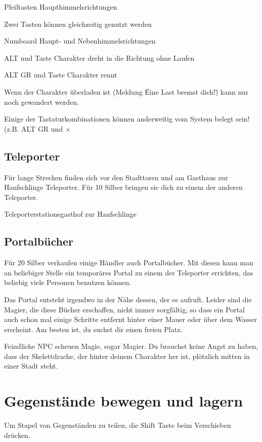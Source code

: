 \documentclass[a4paper,11pt]{book}
\begin{document}
Pfeiltasten  Haupthimmelsrichtungen

Zwei Tasten können gleichzeitig genutzt werden

Numboard  Haupt- und Nebenhimmelsrichtungen

ALT und Taste  Charakter dreht in die Richtung ohne Laufen

ALT GR und Taste  Charakter rennt

Wenn der Charakter überladen ist (Meldung \"Eine Last bremst dich!\") kann nur noch gewandert werden.

Einige der Tastaturkombinationen können anderweitig vom System belegt sein! (z.B. ALT GR und  ×

\subsection{Teleporter}

Für lange Strecken finden sich vor den Stadttoren und am Gasthaus zur Hanfschlinge Teleporter. Für 10 Silber bringen sie dich zu einem der anderen Teleporter.

Teleporterstationegasthof zur Hanfschlinge

\subsection{Portalbücher}

Für 20 Silber verkaufen einige Händler auch Portalbücher. Mit diesen kann man an beliebiger Stelle ein temporäres Portal zu einem der Teleporter errichten, das beliebig viele Personen benutzen können.

Das Portal entsteht irgendwo in der Nähe dessen, der es aufruft. Leider sind die Magier, die diese Bücher erschaffen, nicht immer sorgfältig, so dass ein Portal auch schon mal einige Schritte entfernt hinter einer Mauer oder über dem Wasser erscheint. Am besten ist, du suchst dir einen freien Platz.

Feindliche NPC scheuen Magie, sogar Magier. Du brauchst keine Angst zu haben, dass der Skelettdrache, der hinter deinem Charakter her ist, plötzlich mitten in einer Stadt steht.

\section{Gegenstände bewegen und lagern}

Um Stapel von Gegenständen zu teilen, die Shift Taste beim Verschieben drücken.
\end{document}
